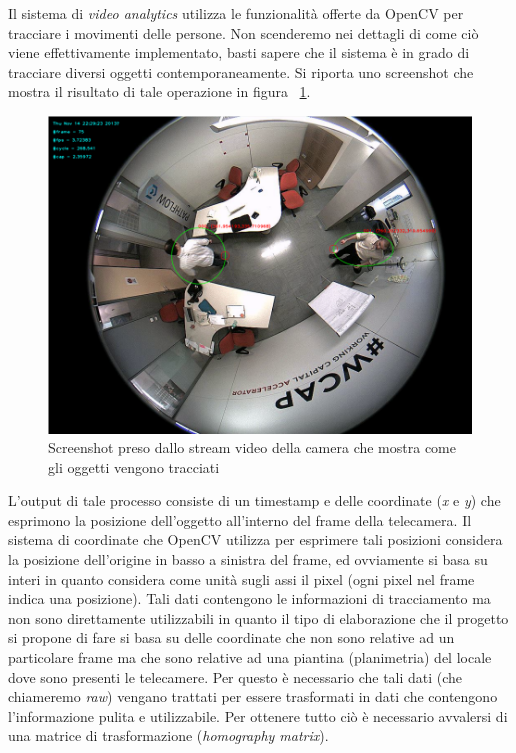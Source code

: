 Il sistema di \textit{video analytics} utilizza le funzionalità offerte da OpenCV per tracciare i movimenti delle persone. Non scenderemo nei dettagli di come ciò viene effettivamente implementato, basti sapere che il sistema è in grado di tracciare diversi oggetti contemporaneamente. Si riporta uno screenshot che mostra il risultato di tale operazione in figura ~\ref{fig:track1}.
\begin{figure}[htpb] 
\centering 
\includegraphics[scale=0.4]{./images/track1.png} 
\caption{Screenshot preso dallo stream video della camera che mostra come gli oggetti vengono tracciati} 
\label{fig:track1}
\end{figure} 
 L'output di tale processo consiste di un timestamp e delle coordinate (\textit{x} e \textit{y}) che esprimono la posizione dell'oggetto all'interno del frame della telecamera. Il sistema di coordinate che OpenCV utilizza per esprimere tali posizioni considera la posizione dell'origine in basso a sinistra del frame, ed ovviamente si basa su interi in quanto considera come unità sugli assi il pixel (ogni pixel nel frame indica una posizione).
Tali dati contengono le informazioni di tracciamento ma non sono direttamente utilizzabili in quanto il tipo di elaborazione che il progetto si propone di fare si basa su delle coordinate che non sono relative ad un particolare frame ma che sono relative ad una piantina (planimetria) del locale dove sono presenti le telecamere. Per questo è necessario che tali dati (che chiameremo \textit{raw}) vengano trattati per essere trasformati in dati che contengono l'informazione pulita e utilizzabile. Per ottenere tutto ciò è necessario avvalersi di una matrice di trasformazione (\textit{homography matrix}).
